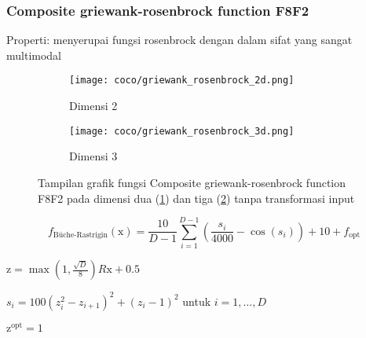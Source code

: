 \subsubsection{Composite griewank-rosenbrock function F8F2}
\noindent Properti:
menyerupai fungsi rosenbrock dengan dalam sifat yang sangat multimodal
\begin{figure}[H]
	\centering
	\begin{subfigure}[b]{0.4\textwidth}
		\centering
		\texttt{[image: coco/griewank\_rosenbrock\_2d.png]}
		\caption{Dimensi 2}
		\label{fig:griewank-rosenbrock-2d}
	\end{subfigure}
	\hfill
	\begin{subfigure}[b]{0.4\textwidth}
		\centering
		\texttt{[image: coco/griewank\_rosenbrock\_3d.png]}
		\caption{Dimensi 3}
		\label{fig:griewank-rosenbrock-3d}
	\end{subfigure}
	\caption{Tampilan grafik fungsi Composite griewank-rosenbrock function F8F2 pada dimensi dua (\cref{fig:griewank-rosenbrock-2d}) dan tiga (\cref{fig:griewank-rosenbrock-3d}) tanpa transformasi input}
	\label{fig:griewank_rosenbrock}
\end{figure}
\begin{equation}
  f_{\text{Büche-Rastrigin}}(\mathrm{x})=\frac{10}{D-1}\sum_{i=1}^{D-1}(\frac{s_i}{4000}-\cos(s_i))+10+f_{\text{opt}}
\end{equation}
\begin{packed_item}
    \item $\mathrm{z}=\max(1,\frac{\sqrt{D}}{8})R\mathrm{x}+0.5$
    \item $s_i=100(z_i^2-z_{i+1})^2+(z_i-1)^2$ untuk $i=1,\ldots,D$
    \item $\mathrm{z}^{\text{opt}}=1$
\end{packed_item}

